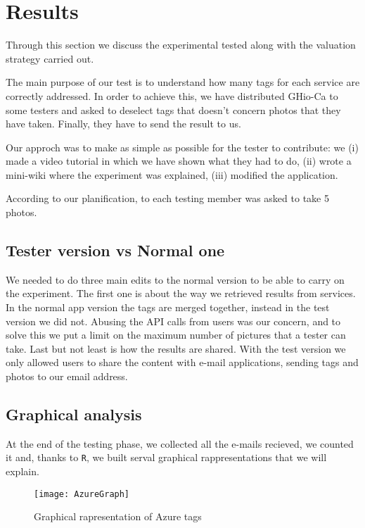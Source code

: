 \section{Results}
\label{sec:results}

Through this section we discuss the experimental tested along with the valuation strategy carried out. 

The main purpose of our test is to understand how many tags for each service are correctly addressed. In order to achieve this, we have distributed GHio-Ca to some testers and asked to deselect tags that doesn't concern photos that they have taken. Finally, they have to send the result to us.

Our approch was to make as simple as possible for the tester to contribute: we (i) made a video tutorial in which we have shown what they had to do, (ii) wrote a mini-wiki where the experiment was explained, (iii) modified the application. 

According to our planification, to each testing member was asked to take 5 photos.

\subsection{Tester version vs Normal one}
We needed to do three main edits to the normal version to be able to carry on the experiment. The first one is about the way we retrieved results from services. In the normal app version the tags are merged together, instead in the test version we did not.
Abusing the API calls from users was our concern, and to solve this we put a limit on the maximum number of pictures that a tester can take.
Last but not least is how the results are shared. With the test version we only allowed users to share the content with e-mail applications, sending tags and photos to our email address.


\subsection{Graphical analysis}

At the end of the testing phase, we collected all the e-mails recieved, we counted it and, thanks to \texttt{R}, we built serval graphical rappresentations that we will explain.

\begin{figure}[H]
\centering
\texttt{[image: AzureGraph]}
\caption{Graphical rapresentation of Azure tags}
\label{testgraphsazure}
\end{figure}

